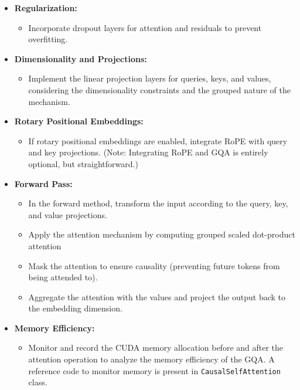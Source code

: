 \documentclass[11pt,addpoints,answers]{exam}
\begin{document}
\begin{questions}
\begin{parts}
\begin{itemize}
    \item \textbf{Regularization:}
    \begin{itemize}
        \item Incorporate dropout layers for attention and residuals to prevent overfitting.
    \end{itemize}
    
    \item \textbf{Dimensionality and Projections:}
    \begin{itemize}
        \item Implement the linear projection layers for queries, keys, and values, considering the dimensionality constraints and the grouped nature of the mechanism.
    \end{itemize}

    \item \textbf{Rotary Positional Embeddings:}
    \begin{itemize}
        \item If rotary positional embeddings are enabled, integrate RoPE with query and key projections. (Note: Integrating RoPE and GQA is entirely optional, but straightforward.)
    \end{itemize}
    
    \item \textbf{Forward Pass:}
    \begin{itemize}
        \item In the forward method, transform the input according to the query, key, and value projections.
        \item Apply the attention mechanism by computing grouped scaled dot-product attention
        \item Mask the attention to ensure causality (preventing future tokens from being attended to).
        \item Aggregate the attention with the values and project the output back to the embedding dimension.
    \end{itemize}
    
    \item \textbf{Memory Efficiency:}
    \begin{itemize}
        \item Monitor and record the CUDA memory allocation before and after the attention operation to analyze the memory efficiency of the GQA. A reference code to monitor memory is present in \lstinline{CausalSelfAttention} class.
    \end{itemize}
    

\end{itemize}
\end{parts}
\end{questions}
\end{document}
